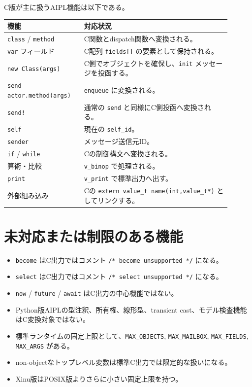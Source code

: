 \documentclass[11pt,a4paper,uplatex,dvipdfmx]{jsarticle}
\begin{document}
C版が主に扱うAIPL機能は以下である。

\begin{longtable}{p{0.30\linewidth}p{0.60\linewidth}}
\toprule
機能 & 対応状況 \\
\midrule
\texttt{class} / \texttt{method} & C関数とdispatch関数へ変換される。 \\
\texttt{var} フィールド & C配列 \texttt{fields[]} の要素として保持される。 \\
\texttt{new Class(args)} & C側でオブジェクトを確保し、\texttt{init} メッセージを投函する。 \\
\texttt{send actor.method(args)} & \texttt{enqueue} に変換される。 \\
\texttt{send!} & 通常の \texttt{send} と同様にC側投函へ変換される。 \\
\texttt{self} & 現在の \texttt{self\_id}。 \\
\texttt{sender} & メッセージ送信元ID。 \\
\texttt{if} / \texttt{while} & Cの制御構文へ変換される。 \\
算術・比較 & \texttt{v\_binop} で処理される。 \\
\texttt{print} & \texttt{v\_print} で標準出力へ出す。 \\
外部組み込み & Cの \texttt{extern value\_t name(int,value\_t*)} としてリンクする。 \\
\bottomrule
\end{longtable}

\section{未対応または制限のある機能}

\begin{itemize}
  \item \texttt{become} はC出力ではコメント \texttt{/* become unsupported */} になる。
  \item \texttt{select} はC出力ではコメント \texttt{/* select unsupported */} になる。
  \item \texttt{now} / \texttt{future} / \texttt{await} はC出力の中心機能ではない。
  \item Python版AIPLの型注釈、所有権、線形型、transient cast、モデル検査機能はC変換対象ではない。
  \item 標準ランタイムの固定上限として、\texttt{MAX\_OBJECTS}, \texttt{MAX\_MAILBOX}, \texttt{MAX\_FIELDS}, \texttt{MAX\_ARGS} がある。
  \item non-objectなトップレベル変数は標準C出力では限定的な扱いになる。
  \item Xinu版はPOSIX版よりさらに小さい固定上限を持つ。
\end{itemize}
\end{document}
